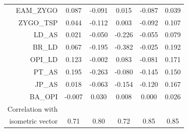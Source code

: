 \begin{refsection}
\begin{table}
\begin{tabular}{rccccc}
  EAM\_ZYGO & 0.087 & -0.091 & 0.015 & -0.087 & 0.039 \\
  ZYGO\_TSP & 0.044 & -0.112 & 0.003 & -0.092 & 0.107 \\
  LD\_AS & 0.021 & -0.050 & -0.226 & -0.055 & 0.079 \\
  BR\_LD & 0.067 & -0.195 & -0.382 & -0.025 & 0.192 \\
  OPI\_LD & 0.123 & -0.002 & 0.083 & -0.081 & 0.171 \\
  PT\_AS & 0.195 & -0.263 & -0.080 & -0.145 & 0.150 \\
  JP\_AS & 0.018 & -0.063 & -0.154 & -0.120 & 0.167 \\
  BA\_OPI & -0.007 & 0.030 & 0.008 & 0.000 & 0.026 \\
        \hline
        Correlation with \\ isometric vector & 0.71 & 0.80 &  0.72 &  0.85 & 0.85 \\
    \end{tabular}
\end{table}


\end{refsection}
